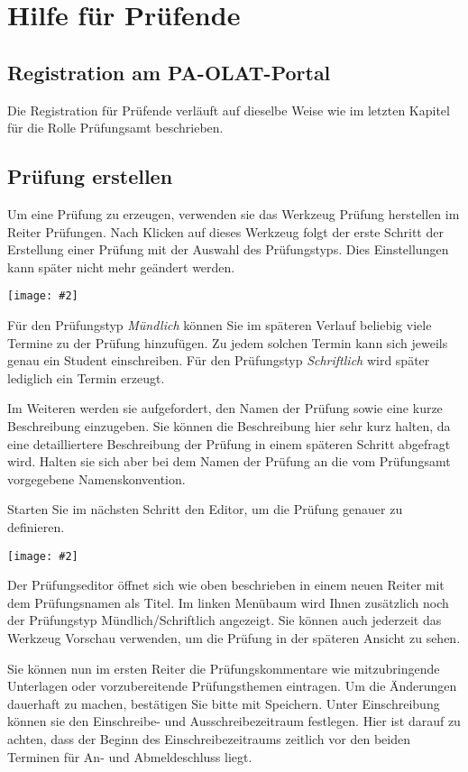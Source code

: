 \documentclass[a4paper,11pt]{article}
\newcommand{\bild}[2]{
    \begin{center}\texttt{[image: \#2]}\end{center}
}
\newcommand{\knopf}[1]{{\sc #1}}
\begin{document}
\clearpage
\section{Hilfe für Prüfende}

\subsection{Registration am PA-OLAT-Portal}

Die Registration für Prüfende verläuft auf dieselbe Weise wie im letzten
Kapitel für die Rolle Prüfungsamt beschrieben.

\subsection{Prüfung erstellen}

Um eine Prüfung zu erzeugen, verwenden sie das Werkzeug \knopf{Prüfung
  herstellen} im Reiter \knopf{Prüfungen}. Nach Klicken auf dieses Werkzeug
folgt der erste Schritt der Erstellung einer Prüfung mit der Auswahl des
Prüfungstyps. Dies Einstellungen kann später nicht mehr geändert werden.

\bild{.9}{Pruefung-Erzeugen-Typ}

Für den Prüfungstyp {\em Mündlich} können Sie im späteren Verlauf beliebig
viele Termine zu der Prüfung hinzufügen. Zu jedem solchen Termin kann sich
jeweils genau ein Student einschreiben.  Für den Prüfungstyp {\em Schriftlich}
wird später lediglich ein Termin erzeugt.

Im Weiteren werden sie aufgefordert, den Namen der Prüfung sowie eine kurze
Beschreibung einzugeben. Sie können die Beschreibung hier sehr kurz halten, da
eine detailliertere Beschreibung der Prüfung in einem späteren Schritt
abgefragt wird. Halten sie sich aber bei dem Namen der Prüfung an die vom
Prüfungsamt vorgegebene Namenskonvention. 

Starten Sie im nächsten Schritt den Editor, um die Prüfung genauer zu
definieren.

\bild{.9}{Pruefung-Erzeugen-Editor}

Der Prüfungseditor öffnet sich wie oben beschrieben in einem neuen Reiter mit
dem Prüfungsnamen als Titel. Im linken Menübaum wird Ihnen zusätzlich noch der
Prüfungstyp \knopf{Mündlich/Schriftlich} angezeigt. Sie können auch jederzeit
das Werkzeug \knopf{Vorschau} verwenden, um die Prüfung in der späteren
Ansicht zu sehen.

Sie können nun im ersten Reiter die Prüfungskommentare wie mitzubringende
Unterlagen oder vorzubereitende Prüfungsthemen eintragen. Um die Änderungen
dauerhaft zu machen, bestätigen Sie bitte mit \knopf{Speichern}. Unter
\knopf{Einschreibung} können sie den Einschreibe- und Ausschreibezeitraum
festlegen. Hier ist darauf zu achten, dass der Beginn des Einschreibezeitraums
zeitlich vor den beiden Terminen für An- und Abmeldeschluss liegt.
\end{document}
